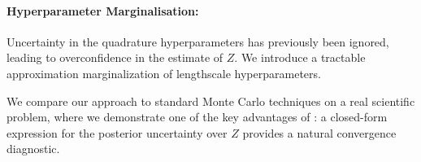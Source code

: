 \documentclass{article}
\begin{document}
\paragraph*{Hyperparameter Marginalisation:} Uncertainty in the quadrature hyperparameters has previously been ignored, leading to overconfidence in the estimate of $Z$.  We introduce a tractable approximation marginalization of lengthscale hyperparameters.



We compare our  approach to standard Monte Carlo techniques on a real scientific problem, where we demonstrate one of the key advantages of : a closed-form expression for the posterior uncertainty over $Z$ provides a natural convergence diagnostic.





\end{document}
